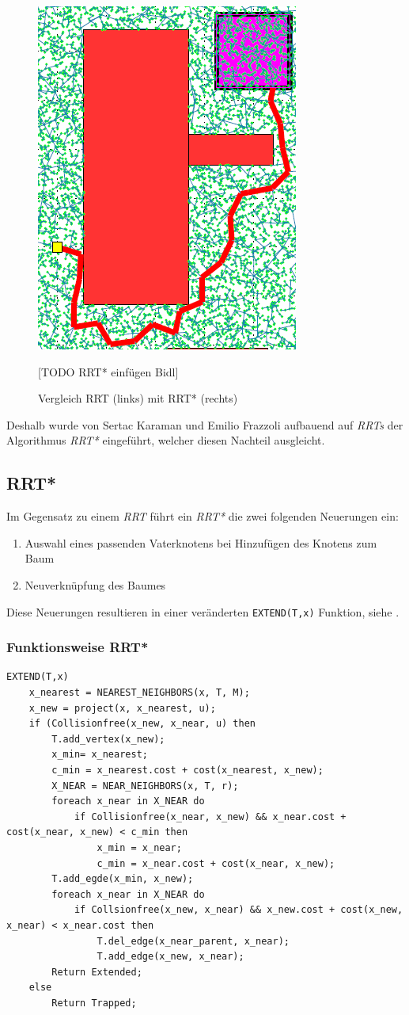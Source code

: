 \begin{figure}
\centering
\includegraphics[scale=0.2]{Bilder/rrt_path.png} 
\caption{Vergleich RRT (links) mit RRT* (rechts) \citep{KaFra10} }
[TODO RRT* einfügen Bidl]
\end{figure}
Deshalb wurde von Sertac Karaman und Emilio Frazzoli aufbauend auf \textit{RRTs} der Algorithmus\textit{ RRT*} eingeführt, welcher diesen Nachteil ausgleicht.
\subsection{RRT*}
\label{RRT*}
Im Gegensatz zu einem \textit{RRT} führt ein \textit{RRT*} die zwei folgenden Neuerungen ein:
\begin{enumerate}
\item Auswahl eines passenden Vaterknotens bei Hinzufügen des Knotens zum Baum
\item Neuverknüpfung des Baumes
\end{enumerate}

Diese Neuerungen resultieren in einer veränderten \verb|EXTEND(T,x)| Funktion, siehe \citep{KaFra10}.
\subsubsection{Funktionsweise RRT*}
\begin{lstlisting}
EXTEND(T,x)
	x_nearest = NEAREST_NEIGHBORS(x, T, M);
	x_new = project(x, x_nearest, u);
	if (Collisionfree(x_new, x_near, u) then
		T.add_vertex(x_new);
		x_min= x_nearest;
		c_min = x_nearest.cost + cost(x_nearest, x_new);
		X_NEAR = NEAR_NEIGHBORS(x, T, r);
		foreach x_near in X_NEAR do
			if Collisionfree(x_near, x_new) && x_near.cost + cost(x_near, x_new) < c_min then
				x_min = x_near;
				c_min = x_near.cost + cost(x_near, x_new);
		T.add_egde(x_min, x_new);
		foreach x_near in X_NEAR do
			if Collsionfree(x_new, x_near) && x_new.cost + cost(x_new, x_near) < x_near.cost then
				T.del_edge(x_near_parent, x_near);
				T.add_edge(x_new, x_near);
		Return Extended;
	else
		Return Trapped;
\end{lstlisting}


